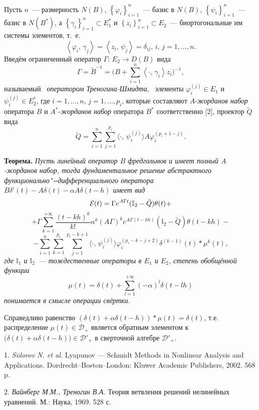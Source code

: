 Пусть $n$~--- размерность $N(B)$, $\left\{\varphi_{i}\right\}_{i=1}^{n}$~--- базис в $N(B)$, $\left\{\psi_{i}\right\}_{i=1}^{n}$~--- базис в $N(B^{\ast})$, а $\left\{\gamma_{i}\right\}_{i=1}^{n}\subset E_{1}^{\ast}$ и $\left\{z_{i}\right\}_{i=1}^{n}\subset E_{2}$~--- биортогональные им системы элементов, т.~е.
$$
\left\langle \varphi_{i},\,\gamma_{j}\right\rangle=\left\langle z_{i},\, \psi_{j}\right\rangle=\delta_{ij},\,i,\,j=1,\ldots,n.
$$
Введём ограниченный оператор $\Gamma:\,E_{2}\to D(B)$ вида
$$
\Gamma=\tilde{B}^{-1}=\biggl(B+\sum\limits_{i=1}^{n}\left\langle\cdot,\, \gamma_{i}\right\rangle z_{i}\biggr)^{-1},
$$
называемый ~{\it оператором Треногина\--Шмидта},~ элементы \lb $\varphi^{(j)}_{i}\in E_{1}$ и $\psi^{(j)}_{i}\in E_{2}^{\ast}$, где $i=1,\ldots,n$, $j=1,\ldots,p_{i}$, которые составляют $A$-{\it жорданов набор} оператора $B$ и $A^{*}$-{\it жорданов набор} оператора $B^{*}$ соответственно [2], проектор $\tilde{Q}$ вида
$$
\tilde{Q}=\sum\limits_{i=1}^{n}\sum\limits_{j=1}^{p_{i}}\langle\cdot,\, \psi_{i}^{(j)}\rangle A\varphi^{(p_{i}+1-j)}_{i}.
$$

\textbf{Теорема.} {\it Пусть линейный оператор $B$ фредгольмов и имеет полный $A$-жорданов набор, тогда фундаментальное решение абстрактного функционально"=дифференциального оператора $B\delta'(t)-A\delta(t)-\alpha A\delta(t-h)$ имеет вид
$$
{\cal E}(t)=\Gamma e^{A\Gamma t}({\mathbb I}_{2}-\tilde{Q})\theta(t)+
$$
$$
+\Gamma\sum\limits_{k=1}^{+\infty}\frac{(t-kh)^{k}}{k!}\alpha^{k}(A\Gamma)^k e^{A\Gamma (t-kh)}({\mathbb I}_{2}-\tilde{Q})\theta(t-kh)-
$$
$$
 -\sum\limits_{i=1}^{n}\sum\limits_{k=1}^{p_{i}}\sum\limits_{j=1}^{p_{i}-k+1}\langle\cdot,\,\psi^{(j)}_{i}\rangle\varphi^{(p_{i}-k-j+2)}_{i}\delta^{(k-1)}(t)\ast\mu^{k}(t),
$$
где ${\mathbb I}_{1}$ и ${\mathbb I}_{2}$~--- тождественные операторы в $E_{1}$ и $E_{2}$, степень обобщённой функции
$$
\mu(t)=\delta(t)+\sum\limits_{l=1}^{+\infty}(-\alpha)^{l}\delta(t-lh)
$$
понимается в смысле операции свёртки.}

Справедливо равенство $(\delta(t)+\alpha\delta(t-h))\ast\mu(t)=\delta(t)$, т.е. распределение $\mu(t)\in{\mathcal D}_{+}$ является обратным элементом к $\bigl(\delta(t)+\alpha\delta(t-h)\bigr)\in{\mathcal D}'_{+}$ в сверточной алгебре ${\mathcal D}'_{+}$.

\litlist


1. {\it Sidorov N. et al.} Lyapunov --- Schmidt Methods in Non\-linear Analysis and Applications. Dordrecht--Boston--London: Kluwer Academic Publishers, 2002. 568 p.


2. {\it Вайнберг М.М., Треногин В.А.} Теория ветвления решений нелинейных уравнений. М.: Наука, 1969. 528 с.
